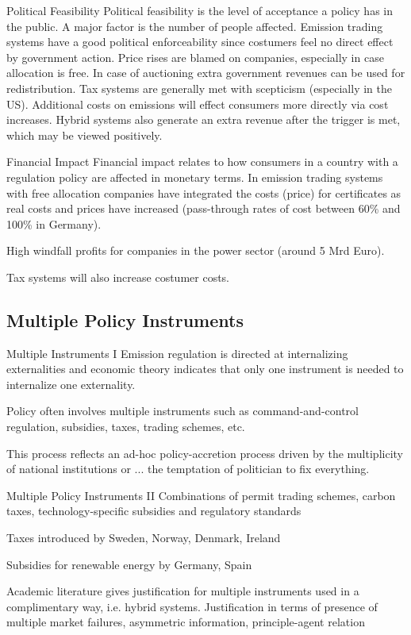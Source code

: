 Political Feasibility
Political feasibility is the level of acceptance a policy has in the public. A major factor is the number of people affected.
	Emission trading systems have a good political enforceability since costumers feel no direct effect by government action.
	Price rises are blamed on companies, especially in case allocation is free. In case of auctioning extra government revenues can be used for redistribution.
	Tax systems are generally met with scepticism (especially in the US). Additional costs on emissions will effect consumers more directly via cost increases.
	Hybrid systems also generate an extra revenue after the trigger is met, which may be viewed positively.


Financial Impact
Financial impact relates to how consumers in a country with a regulation policy are affected in monetary terms.
	In emission trading systems with free allocation companies have integrated the costs (price) for certificates
	as real costs and prices have increased (pass-through rates of cost between 60\% and 100\% in Germany).
	
	High windfall profits for companies in the power sector (around 5 Mrd Euro).
	
	Tax systems will also increase costumer costs.


\subsection{Multiple Policy Instruments}

Multiple Instruments I
	Emission regulation is directed at internalizing externalities and economic theory indicates that only one instrument is needed to
	internalize one externality.
	
	Policy often involves multiple instruments such as command-and-control regulation, subsidies, taxes, trading schemes, etc.
	
	This process reflects an ad-hoc policy-accretion process driven by the multiplicity of national institutions or ...
	the temptation of politician to fix everything.


Multiple Policy Instruments II
	Combinations of permit trading schemes, carbon taxes, technology-specific subsidies and regulatory standards
	
	Taxes introduced by Sweden, Norway, Denmark, Ireland
	
	Subsidies for renewable energy by Germany, Spain
	
	Academic literature gives justification for multiple instruments used in a complimentary way, i.e. hybrid systems. 
	Justification in terms of presence of multiple market failures, asymmetric information, principle-agent relation
 


